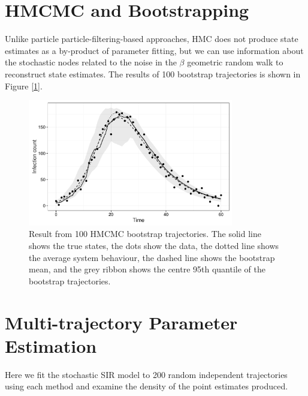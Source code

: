 \section{HMCMC and Bootstrapping}

	Unlike particle particle-filtering-based approaches, HMC does not produce state estimates as a by-product of parameter fitting, but we can use information about the stochastic nodes related to the noise in the $\beta$ geometric random walk to reconstruct state estimates. The results of 100 bootstrap trajectories is shown in Figure [\ref{hmcboot}].

	\begin{figure}[H]
        \centering
        \captionsetup{width=.8\linewidth}
        \includegraphics[width=0.8\textwidth]{./images/hmcboot.pdf}
        \caption{Result from 100 HMCMC bootstrap trajectories. The solid line shows the true states, the dots show the data, the dotted line shows the average system behaviour, the dashed line shows the bootstrap mean, and the grey ribbon shows the centre 95th quantile of the bootstrap trajectories.}
        \label{hmcboot}
    \end{figure}


\section{Multi-trajectory Parameter Estimation}

	Here we fit the stochastic SIR model to 200 random independent trajectories using each method and examine the density of the point estimates produced. 

